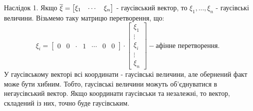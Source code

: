 \newpage



Наслідок 1. Якщо $\overline{\xi} = \begin{bmatrix}
 \xi_1 & \cdots & \xi_n
\end{bmatrix}$ - гаусівський вектор, то $\xi_1, ... , \xi_n$ - гаусівські величини.
Візьмемо таку матрицю перетворення, що:
$$
\xi_i = \begin{bmatrix}0& 0& \cdot & 1 & \cdots & 0 & 0\end{bmatrix}\cdot \begin{bmatrix}
  \xi_1 \\ \vdots \\ \xi_i \\ \vdots \\ \xi_n
\end{bmatrix} - \text{афінне перетворення.}
$$
У гаусівському векторі всі координати - гаусівські величини, але обернений факт може бути хибним. Тобто, гаусівські величини можуть об'єднуватися в негаусівський вектор. Якщо координати гаусівськи та незалежні, то вектор, складений із них, точно буде гаусівським.
